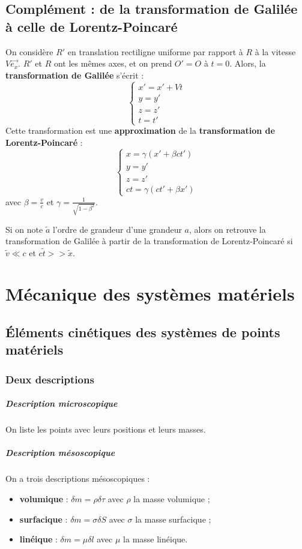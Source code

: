 \documentclass[french]{book}
\theoremstyle{plain}
\theoremstyle{definition}
\theoremstyle{remark}
\begin{document}
\section{Complément : de la transformation de Galilée à celle de Lorentz-Poincaré}
On considère $R'$ en translation rectiligne uniforme par rapport à $R$ à la vitesse $V\overrightarrow{e_x}$. $R'$ et $R$ ont les mêmes axes, et on prend $O'=O$ à $t=0$. Alors, la \textbf{transformation de Galilée} s'écrit : $$\begin{cases}
	x'=x'+Vt \\
	y=y' \\
	z=z' \\
	t=t'
\end{cases}$$ Cette transformation est une \textbf{approximation} de la \textbf{transformation de Lorentz-Poincaré} : $$\begin{cases}
x=\gamma(x'+\beta ct') \\
y=y' \\
z=z' \\
ct=\gamma(ct'+\beta x')
\end{cases}$$ avec $\beta=\displaystyle\frac{v}{c}$ et $\gamma=\displaystyle\frac{1}{\sqrt{1-\beta^2}}$. \\ \par Si on note $\tilde{a}$ l'ordre de grandeur d'une grandeur $a$, alors on retrouve la transformation de Galilée à partir de la transformation de Lorentz-Poincaré si $\tilde{v}\ll c$ et $c\tilde{t}>>\tilde{x}$.

\chapter{Mécanique des systèmes matériels}
\localtableofcontents
\section{Éléments cinétiques des systèmes de points matériels}
\subsection{Deux descriptions}
\paragraph{Description microscopique} On liste les points avec leurs positions et leurs masses.
\paragraph{Description mésoscopique}
On a trois descriptions mésoscopiques : 
\begin{itemize}
	\item \textbf{volumique} : $\delta m=\rho\delta\tau$ avec $\rho$ la masse volumique ;
	\item \textbf{surfacique} : $\delta m=\sigma\delta S$ avec $\sigma$ la masse surfacique ;
	\item \textbf{linéique} : $\delta m=\mu\delta l$ avec $\mu$ la masse linéique.
\end{itemize}
\end{document}
